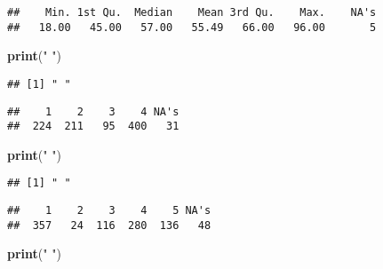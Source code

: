 \documentclass[]{article}
\newenvironment{Shaded}{\begin{snugshade}}{\end{snugshade}}
\newcommand{\KeywordTok}[1]{\textcolor[rgb]{0.13,0.29,0.53}{\textbf{#1}}}
\newcommand{\StringTok}[1]{\textcolor[rgb]{0.31,0.60,0.02}{#1}}
\newcommand{\OperatorTok}[1]{\textcolor[rgb]{0.81,0.36,0.00}{\textbf{#1}}}
\newcommand{\NormalTok}[1]{#1}
\begin{document}
\begin{verbatim}
##    Min. 1st Qu.  Median    Mean 3rd Qu.    Max.    NA's 
##   18.00   45.00   57.00   55.49   66.00   96.00       5
\end{verbatim}

\begin{Shaded}
\begin{Highlighting}[]
\KeywordTok{print}\NormalTok{(}\StringTok{" "}\NormalTok{)}
\end{Highlighting}
\end{Shaded}

\begin{verbatim}
## [1] " "
\end{verbatim}

\begin{Shaded}
\end{Shaded}

\begin{verbatim}
##    1    2    3    4 NA's 
##  224  211   95  400   31
\end{verbatim}

\begin{Shaded}
\begin{Highlighting}[]
\KeywordTok{print}\NormalTok{(}\StringTok{" "}\NormalTok{)}
\end{Highlighting}
\end{Shaded}

\begin{verbatim}
## [1] " "
\end{verbatim}

\begin{Shaded}
\end{Shaded}

\begin{verbatim}
##    1    2    3    4    5 NA's 
##  357   24  116  280  136   48
\end{verbatim}

\begin{Shaded}
\begin{Highlighting}[]
\KeywordTok{print}\NormalTok{(}\StringTok{" "}\NormalTok{)}
\end{Highlighting}
\end{Shaded}
\end{document}
